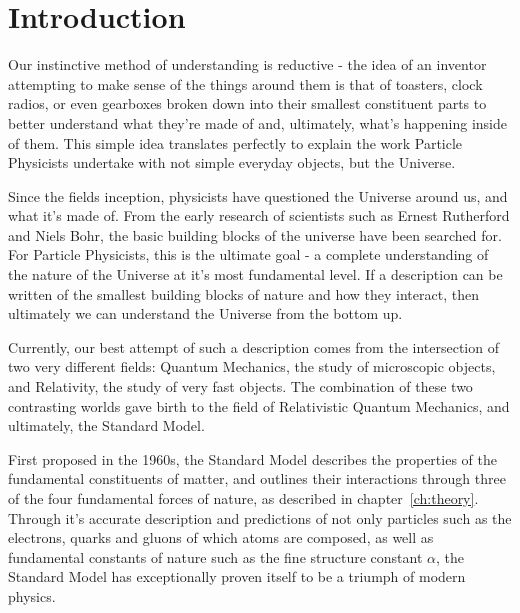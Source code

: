 
\chapter{Introduction}  %

\ifpdf
    \graphicspath{{Chapter1/Figs/Raster/}{Chapter1/Figs/PDF/}{Chapter1/Figs/}}
\else
    \graphicspath{{Chapter1/Figs/Vector/}{Chapter1/Figs/}}
\fi


\label{sec:introduction_intro}

Our instinctive method of understanding is reductive - the idea of an
inventor attempting to make sense of the things around them is
that of toasters, clock radios, or even gearboxes broken down into
their smallest constituent parts to better understand what they're made of and,
ultimately, what's happening inside of them. This simple idea translates
perfectly to explain the work Particle Physicists undertake with
not simple everyday objects, but the Universe.

Since the fields inception, physicists have questioned the Universe
around us, and what it's made of. From the early research of scientists such as
Ernest Rutherford and Niels Bohr, the basic building
blocks of the universe have been searched for. For Particle Physicists, this is
the ultimate goal - a complete understanding of the nature of the Universe
at it's most
fundamental level. If a description can be written of the smallest
building blocks of
nature and how they interact, then ultimately we can understand
the Universe from the bottom up.

Currently, our best attempt of such a description comes from the intersection of
two very different
fields: Quantum Mechanics, the study of microscopic objects, and Relativity, the
study of very fast objects. The combination of these
two contrasting worlds gave birth to the field of Relativistic
Quantum Mechanics, and ultimately, the Standard Model.

First proposed in the 1960s, the Standard Model describes the
properties of the fundamental constituents of matter, and outlines their
interactions through three of the four fundamental forces of nature, as
described in chapter~\ref{ch:theory}. Through
it's accurate description and predictions of not only particles such as
the electrons, quarks and gluons of which atoms are composed,
as well as fundamental constants of nature such as the fine structure constant
$\alpha$, the
Standard Model has exceptionally proven itself to be a triumph of
modern physics.

